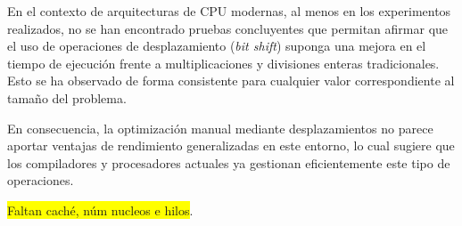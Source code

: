 \documentclass[11pt,a4paper,twoside]{article}
\theoremstyle{definition}
\begin{document}
	En el contexto de arquitecturas de CPU modernas, al menos en los experimentos realizados, no se han encontrado pruebas concluyentes que permitan afirmar que el uso de operaciones de desplazamiento (\textit{bit shift}) suponga una mejora en el tiempo de ejecución frente a multiplicaciones y divisiones enteras tradicionales. Esto se ha observado de forma consistente para cualquier valor correspondiente al tamaño del problema.
	
	En consecuencia, la optimización manual mediante desplazamientos no parece aportar ventajas de rendimiento generalizadas en este entorno, lo cual sugiere que los compiladores y procesadores actuales ya gestionan eficientemente este tipo de operaciones.
	
	\colorbox{yellow}{Faltan caché, núm nucleos e hilos}.



\printbibliography
	
	
	
\end{document}
